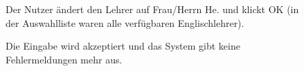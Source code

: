\documentclass{swp1}
\begin{document}
\begin{figure}
\caption{Der Nutzer ändert den Lehrer auf Frau/Herrn He. und klickt OK (in der Auswahlliste waren alle verfügbaren Englischlehrer). }
\label{ab12}
\end{figure}

\begin{figure}
\caption{Die Eingabe wird akzeptiert und das System gibt keine Fehlermeldungen mehr aus. }
\label{ab13}
\end{figure}
\end{document}
